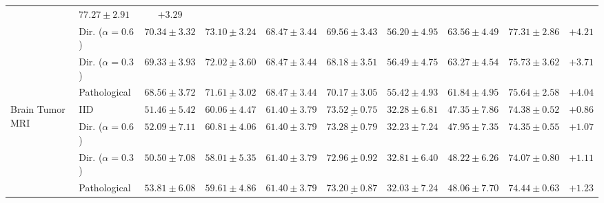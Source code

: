 \begin{table}[htbp!]
\begin{tabular*}{\textwidth}{@{\extracolsep{\fill}}llcccccccc@{}}
& $\mathbf{77.27{\pm}2.91}$
& $+3.29$ \\
& Dir. ($\alpha=0.6$)
& $70.34{\pm}3.32$
& $\underline{73.10{\pm}3.24}$
& $68.47{\pm}3.44$
& $69.56{\pm}3.43$
& $56.20{\pm}4.95$
& $63.56{\pm}4.49$
& $\mathbf{77.31{\pm}2.86}$
& $+4.21$ \\
& Dir. ($\alpha=0.3$)
& $69.33{\pm}3.93$
& $\underline{72.02{\pm}3.60}$
& $68.47{\pm}3.44$
& $68.18{\pm}3.51$
& $56.49{\pm}4.75$
& $63.27{\pm}4.54$
& $\mathbf{75.73{\pm}3.62}$
& $+3.71$ \\
& Pathological
& $68.56{\pm}3.72$
& $\underline{71.61{\pm}3.02}$
& $68.47{\pm}3.44$
& $70.17{\pm}3.05$
& $55.42{\pm}4.93$
& $61.84{\pm}4.95$
& $\mathbf{75.64{\pm}2.58}$
& $+4.04$ \\
\midrule
\multirow{4}{*}{Brain Tumor MRI}
& IID
& $51.46{\pm}5.42$
& $60.06{\pm}4.47$
& $61.40{\pm}3.79$
& $\underline{73.52{\pm}0.75}$
& $32.28{\pm}6.81$
& $47.35{\pm}7.86$
& $\mathbf{74.38{\pm}0.52}$
& $+0.86$ \\
& Dir. ($\alpha=0.6$)
& $52.09{\pm}7.11$
& $60.81{\pm}4.06$
& $61.40{\pm}3.79$
& $\underline{73.28{\pm}0.79}$
& $32.23{\pm}7.24$
& $47.95{\pm}7.35$
& $\mathbf{74.35{\pm}0.55}$
& $+1.07$ \\
& Dir. ($\alpha=0.3$)
& $50.50{\pm}7.08$
& $58.01{\pm}5.35$
& $61.40{\pm}3.79$
& $\underline{72.96{\pm}0.92}$
& $32.81{\pm}6.40$
& $48.22{\pm}6.26$
& $\mathbf{74.07{\pm}0.80}$
& $+1.11$ \\
& Pathological
& $53.81{\pm}6.08$
& $59.61{\pm}4.86$
& $61.40{\pm}3.79$
& $\underline{73.20{\pm}0.87}$
& $32.03{\pm}7.24$
& $48.06{\pm}7.70$
& $\mathbf{74.44{\pm}0.63}$
& $+1.23$ \\
\bottomrule
\end{tabular*}
\end{table}